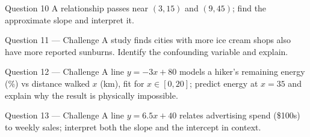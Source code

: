 \documentclass[11pt]{article}
\begin{document}
\begin{qbox}{Question 10}
A relationship passes near $(3,15)$ and $(9,45)$; find the approximate slope and interpret it.\workspace{2.4cm}
\end{qbox}

\begin{qbox}{Question 11 --- Challenge}
A study finds cities with more ice cream shops also have more reported sunburns. Identify the confounding variable and explain.\workspace{3cm}
\end{qbox}

\begin{qbox}{Question 12 --- Challenge}
A line $y=-3x+80$ models a hiker's remaining energy (\%) vs distance walked $x$ (km), fit for $x\in[0,20]$; predict energy at $x=35$ and explain why the result is physically impossible.\workspace{3.2cm}
\end{qbox}

\begin{qbox}{Question 13 --- Challenge}
A line $y=6.5x+40$ relates advertising spend (\$100s) to weekly sales; interpret both the slope and the intercept in context.\workspace{3cm}
\end{qbox}

\clearpage
{}
\end{document}
